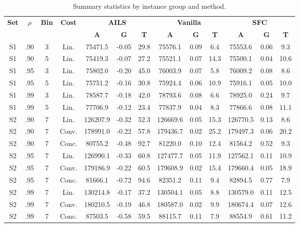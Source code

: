 \begin{table}[!ht]
\centering
\footnotesize
\caption{Summary statistics by instance group and method.}
\label{tab:method_statistics_by_group}
\begin{tabular}{cccc|ccc|ccc|ccc}
\hline
\multirow{2}{*}{\textbf{Set}} &
\multirow{2}{*}{\textbf{$\rho$}} &
\multirow{2}{*}{\textbf{Bin}} &
\multirow{2}{*}{\textbf{Cost}} &
\multicolumn{3}{c|}{\textbf{AILS}} &
\multicolumn{3}{c|}{\textbf{Vanilla}} &
\multicolumn{3}{c}{\textbf{SFC}} \\
\cline{5-13}
& & & &
\textbf{A} & \textbf{G} & \textbf{T} &
\textbf{A} & \textbf{G} & \textbf{T} &
\textbf{A} & \textbf{G} & \textbf{T} \\
\hline
S1 & .90 & 3 & Lin. & 75471.5 & -0.05 & 29.8 & 75576.1 & 0.09 & 6.4 & 75553.6 & 0.06 & 9.3 \\
S1 & .90 & 5 & Lin. & 75419.3 & -0.07 & 27.2 & 75521.1 & 0.07 & 14.3 & 75500.1 & 0.04 & 10.6 \\
S1 & .95 & 3 & Lin. & 75802.0 & -0.20 & 45.0 & 76003.9 & 0.07 & 5.8 & 76009.2 & 0.08 & 8.6 \\
S1 & .95 & 5 & Lin. & 75751.2 & -0.16 & 30.8 & 75924.4 & 0.06 & 10.9 & 75916.1 & 0.05 & 10.0 \\
S1 & .99 & 3 & Lin. & 78587.7 & -0.18 & 42.0 & 78793.6 & 0.08 & 6.6 & 78925.0 & 0.24 & 9.7 \\
S1 & .99 & 5 & Lin. & 77706.9 & -0.12 & 23.4 & 77837.9 & 0.04 & 8.3 & 77866.6 & 0.08 & 11.1 \\
S2 & .90 & 7 & Lin. & 126207.9 & -0.32 & 52.3 & 126669.6 & 0.05 & 15.3 & 126770.5 & 0.13 & 8.6 \\
S2 & .90 & 7 & Conv. & 178991.0 & -0.22 & 57.8 & 179436.7 & 0.02 & 25.2 & 179497.3 & 0.06 & 20.2 \\
S2 & .90 & 7 & Conc. & 80755.2 & -0.48 & 92.7 & 81220.0 & 0.10 & 12.4 & 81564.2 & 0.52 & 9.3 \\
S2 & .95 & 7 & Lin. & 126990.1 & -0.33 & 60.8 & 127477.7 & 0.05 & 11.9 & 127562.1 & 0.11 & 10.9 \\
S2 & .95 & 7 & Conv. & 179186.9 & -0.22 & 60.5 & 179608.9 & 0.02 & 15.4 & 179660.4 & 0.05 & 18.9 \\
S2 & .95 & 7 & Conc. & 81666.1 & -0.72 & 94.6 & 82351.2 & 0.11 & 9.4 & 82894.5 & 0.77 & 7.9 \\
S2 & .99 & 7 & Lin. & 130214.8 & -0.17 & 37.2 & 130504.1 & 0.05 & 8.8 & 130579.0 & 0.11 & 12.5 \\
S2 & .99 & 7 & Conv. & 180210.5 & -0.19 & 46.8 & 180587.0 & 0.02 & 9.9 & 180674.4 & 0.07 & 12.6 \\
S2 & .99 & 7 & Conc. & 87503.5 & -0.58 & 59.5 & 88115.7 & 0.11 & 7.9 & 88554.9 & 0.61 & 11.2 \\
\hline
\end{tabular}
\end{table}
